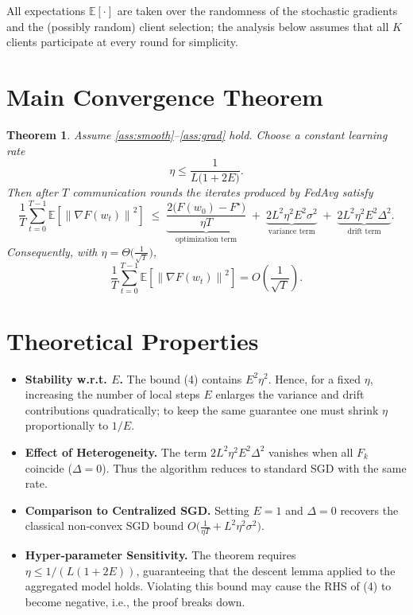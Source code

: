 \documentclass{article}
\newtheorem{theorem}{Theorem}
\newcommand{\EE}{\mathbb{E}}
\newcommand{\norm}[1]{\left\|#1\right\|}
\newcommand{\grad}{\nabla}
\begin{document}
All expectations $\EE[\cdot]$ are taken over the randomness of the stochastic gradients and the (possibly random) client selection; the analysis below assumes that all $K$ clients participate at every round for simplicity.

\section*{Main Convergence Theorem}
\begin{theorem}\label{thm:main}
Assume \ref{ass:smooth}--\ref{ass:grad} hold.
Choose a constant learning rate
\[
\eta\le \frac{1}{L\bigl(1+2E\bigr)} .
\]
Then after $T$ communication rounds the iterates produced by FedAvg satisfy
\[
\frac{1}{T}\sum_{t=0}^{T-1}\EE\!\left[\norm{\grad F(w_t)}^{2}\right]
\;\le\;
\underbrace{\frac{2\bigl(F(w_0)-F^{\star}\bigr)}{\eta T}}_{\text{optimization term}}
\;+\;
\underbrace{2L^{2}\eta^{2}E^{2}\sigma^{2}}_{\text{variance term}}
\;+\;
\underbrace{2L^{2}\eta^{2}E^{2}\Delta^{2}}_{\text{drift term}} .
\tag{4}
\]
Consequently, with $\eta = \Theta\!\bigl(\tfrac{1}{\sqrt{T}}\bigr)$,
\[
\frac{1}{T}\sum_{t=0}^{T-1}\EE\!\left[\norm{\grad F(w_t)}^{2}\right]
= O\!\left(\frac{1}{\sqrt{T}}\right).
\]
\end{theorem}

\section*{Theoretical Properties}
\begin{itemize}
\item \textbf{Stability w.r.t. $E$.} The bound (4) contains $E^{2}\eta^{2}$. Hence, for a fixed $\eta$, increasing the number of local steps $E$ enlarges the variance and drift contributions quadratically; to keep the same guarantee one must shrink $\eta$ proportionally to $1/E$.
\item \textbf{Effect of Heterogeneity.} The term $2L^{2}\eta^{2}E^{2}\Delta^{2}$ vanishes when all $F_k$ coincide ($\Delta=0$). Thus the algorithm reduces to standard SGD with the same rate.
\item \textbf{Comparison to Centralized SGD.} Setting $E=1$ and $\Delta=0$ recovers the classical non‑convex SGD bound $O\bigl(\frac{1}{\eta T}+L^{2}\eta^{2}\sigma^{2}\bigr)$.
\item \textbf{Hyper‑parameter Sensitivity.} The theorem requires $\eta \le 1/(L(1+2E))$, guaranteeing that the descent lemma applied to the aggregated model holds. Violating this bound may cause the RHS of (4) to become negative, i.e., the proof breaks down.
\end{itemize}
\end{document}
